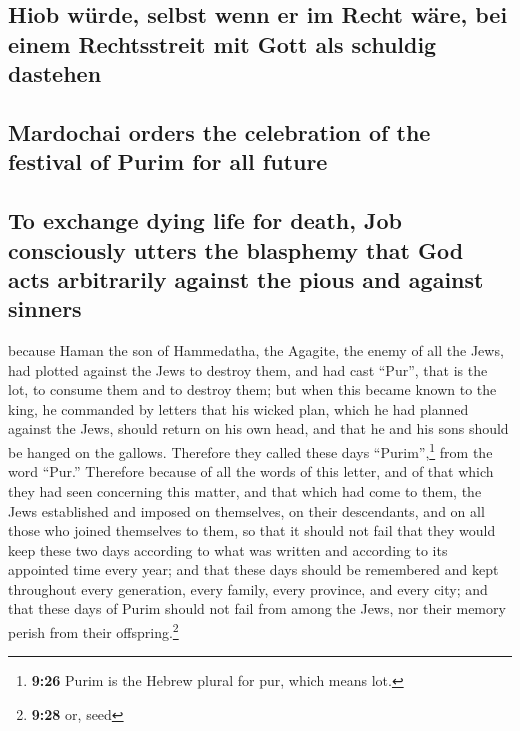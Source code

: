 \hypertarget{hiob-wuxfcrde-selbst-wenn-er-im-recht-wuxe4re-bei-einem-rechtsstreit-mit-gott-als-schuldig-dastehen}{%
\subsection{Hiob würde, selbst wenn er im Recht wäre, bei einem
Rechtsstreit mit Gott als schuldig
dastehen}\label{hiob-wuxfcrde-selbst-wenn-er-im-recht-wuxe4re-bei-einem-rechtsstreit-mit-gott-als-schuldig-dastehen}}

\hypertarget{mardochai-orders-the-celebration-of-the-festival-of-purim-for-all-future}{%
\subsection{Mardochai orders the celebration of the festival of Purim
for all
future}\label{mardochai-orders-the-celebration-of-the-festival-of-purim-for-all-future}}

\hypertarget{to-exchange-dying-life-for-death-job-consciously-utters-the-blasphemy-that-god-acts-arbitrarily-against-the-pious-and-against-sinners}{%
\subsection{To exchange dying life for death, Job consciously utters the
blasphemy that God acts arbitrarily against the pious and against
sinners}\label{to-exchange-dying-life-for-death-job-consciously-utters-the-blasphemy-that-god-acts-arbitrarily-against-the-pious-and-against-sinners}}

 because Haman the son of Hammedatha, the Agagite, the
enemy of all the Jews, had plotted against the Jews to destroy them, and
had cast ``Pur'', that is the lot, to consume them and to destroy them;
 but when this became known to the king, he commanded by
letters that his wicked plan, which he had planned against the Jews,
should return on his own head, and that he and his sons should be hanged
on the gallows.  Therefore they called these days
``Purim'',\footnote{\textbf{9:26} Purim is the Hebrew plural for pur,
  which means lot.} from the word ``Pur.'' Therefore because of all the
words of this letter, and of that which they had seen concerning this
matter, and that which had come to them,  the Jews
established and imposed on themselves, on their descendants, and on all
those who joined themselves to them, so that it should not fail that
they would keep these two days according to what was written and
according to its appointed time every year;  and that
these days should be remembered and kept throughout every generation,
every family, every province, and every city; and that these days of
Purim should not fail from among the Jews, nor their memory perish from
their offspring.\footnote{\textbf{9:28} or, seed}

